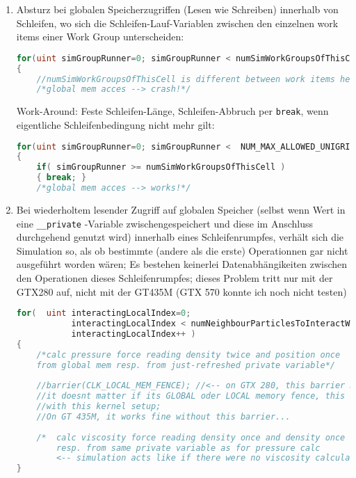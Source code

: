 		\begin{enumerate}
		
			\item Absturz bei globalen Speicherzugriffen (Lesen wie Schreiben) innerhalb von Schleifen, 
			wo sich die Schleifen-Lauf-Variablen zwischen den einzelnen work items einer
			Work Group unterscheiden:
			\begin{lstlisting}[language=OpenCL]
for(uint simGroupRunner=0; simGroupRunner < numSimWorkGroupsOfThisCell; simGroupRunner++ )
{
	//numSimWorkGroupsOfThisCell is different between work items here!
	/*global mem acces --> crash!*/
			\end{lstlisting}
			
			Work-Around: Feste Schleifen-Länge, Schleifen-Abbruch per \lstinline|break|, wenn eigentliche
			Schleifenbedingung nicht mehr gilt:
			\begin{lstlisting}[language=OpenCL]
for(uint simGroupRunner=0; simGroupRunner <  NUM_MAX_ALLOWED_UNIGRID_CELL_SPLIT_FACTOR; simGroupRunner++ )
{
	if( simGroupRunner >= numSimWorkGroupsOfThisCell )
    { break; }
    /*global mem acces --> works!*/
			\end{lstlisting}
			
		\item Bei wiederholtem lesender Zugriff auf globalen Speicher (selbst wenn Wert in eine 
		\lstinline|__private| -Variable zwischengespeichert und diese im Anschluss durchgehend genutzt wird) 
		innerhalb eines Schleifenrumpfes, verhält sich die Simulation so, als ob bestimmte (andere als die erste)
		Operationnen gar nicht ausgeführt worden wären; Es bestehen keinerlei Datenabhängikeiten zwischen
		den Operationen dieses Schleifenrumpfes;
		dieses Problem tritt nur mit der GTX280 auf, nicht mit der GT435M (GTX 570 konnte ich noch nicht testen)
		\begin{lstlisting}[language=OpenCL]
for(  uint interactingLocalIndex=0; 
           interactingLocalIndex < numNeighbourParticlesToInteractWith;
           interactingLocalIndex++ )
{  
	/*calc pressure force reading density twice and position once 
	from global mem resp. from just-refreshed private variable*/ 
	
	//barrier(CLK_LOCAL_MEM_FENCE); //<-- on GTX 280, this barrier must be commented in; 
	//it doesnt matter if its GLOBAL oder LOCAL memory fence, this is weird, as there is no local memory accces at all
	//with this kernel setup; 
	//On GT 435M, it works fine without this barrier...
	
	/*	calc viscosity force reading density once and density once from global mem 
		resp. from same private variable as for pressure calc
		<-- simulation acts like if there were no viscosity calculation at all without barrier!*/
}
		\end{lstlisting}
		

\end{enumerate}
